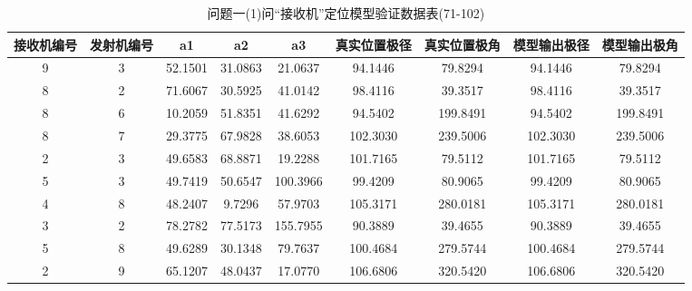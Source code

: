 \documentclass[withoutpreface,bwprint]{cumcmthesis} %
\begin{document}
\begin{appendices}
						\begin{table}[htbp!]
							\caption{问题一(1)问“接收机”定位模型验证数据表(71-102)}
							\footnotesize
								\centering
							\begin{tabular}{@{}ccccccccc@{}}
								\toprule
								\textbf{接收机编号} & \textbf{发射机编号} & \textbf{a1} & \textbf{a2} & \textbf{a3} & \textbf{真实位置极径} & \textbf{真实位置极角} & \textbf{模型输出极径} & \textbf{模型输出极角} \\ \midrule
								9              & 3              & 52.1501     & 31.0863     & 21.0637     & 94.1446         & 79.8294         & 94.1446         & 79.8294         \\
								8              & 2              & 71.6067     & 30.5925     & 41.0142     & 98.4116         & 39.3517         & 98.4116         & 39.3517         \\
								8              & 6              & 10.2059     & 51.8351     & 41.6292     & 94.5402         & 199.8491        & 94.5402         & 199.8491        \\
								8              & 7              & 29.3775     & 67.9828     & 38.6053     & 102.3030        & 239.5006        & 102.3030        & 239.5006        \\
								2              & 3              & 49.6583     & 68.8871     & 19.2288     & 101.7165        & 79.5112         & 101.7165        & 79.5112         \\
								5              & 3              & 49.7419     & 50.6547     & 100.3966    & 99.4209         & 80.9065         & 99.4209         & 80.9065         \\
								4              & 8              & 48.2407     & 9.7296      & 57.9703     & 105.3171        & 280.0181        & 105.3171        & 280.0181        \\
								3              & 2              & 78.2782     & 77.5173     & 155.7955    & 90.3889         & 39.4655         & 90.3889         & 39.4655         \\
								5              & 8              & 49.6289     & 30.1348     & 79.7637     & 100.4684        & 279.5744        & 100.4684        & 279.5744        \\
								2              & 9              & 65.1207     & 48.0437     & 17.0770     & 106.6806        & 320.5420        & 106.6806        & 320.5420        \\

\end{tabular}
\end{table}
\end{appendices}
\end{document}
